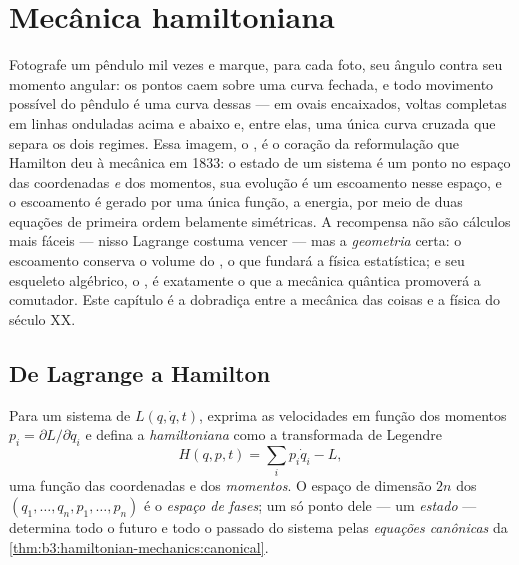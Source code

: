 \chapter{Mecânica hamiltoniana}\label{ch:b3:hamiltonian-mechanics}

Fotografe um pêndulo mil vezes e marque, para cada foto, seu ângulo
contra seu momento angular: os pontos caem sobre uma curva fechada, e
todo movimento possível do pêndulo é uma curva dessas ---  em ovais encaixados, voltas completas em linhas onduladas
acima e abaixo e, entre elas, uma única curva cruzada que separa os
dois regimes. Essa imagem, o \emph{}, é o coração da
reformulação que Hamilton deu à mecânica em 1833: o estado de um
sistema é um ponto no espaço das coordenadas \emph{e} dos momentos, sua
evolução é um escoamento nesse espaço, e o escoamento é gerado por uma
única função, a energia, por meio de duas equações de primeira ordem
belamente simétricas. A recompensa não são cálculos mais fáceis ---
nisso Lagrange costuma vencer --- mas a \emph{geometria} certa: o
escoamento conserva o volume do , o que fundará a física
estatística; e seu esqueleto algébrico, o , é
exatamente o que a mecânica quântica promoverá a comutador. Este
capítulo é a dobradiça entre a mecânica das coisas e a física do
século XX.

\section{De Lagrange a Hamilton}

\begin{definition}\label{def:b3:hamiltonian-mechanics:hamiltonian}
Para um sistema de  $L(q, \dot q, t)$, exprima as
velocidades em função dos momentos $p_i = \partial L/\partial\dot q_i$
e defina a \emph{hamiltoniana} como a transformada de Legendre
\[
H(q, p, t) = \sum_i p_i\dot q_i - L ,
\]
uma função das coordenadas e dos \emph{momentos}. O espaço de dimensão
$2n$ dos $(q_1, \dots, q_n, p_1, \dots, p_n)$ é o
\emph{espaço de fases}; um só ponto dele --- um \emph{estado} ---
determina todo o futuro e todo o passado do sistema pelas
\emph{equações canônicas} da
\cref{thm:b3:hamiltonian-mechanics:canonical}.
\end{definition}

